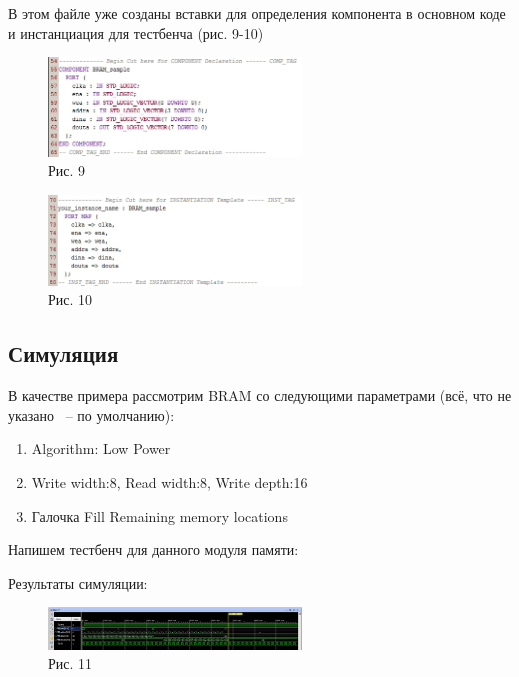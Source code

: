 В этом файле уже созданы вставки для определения компонента в основном коде и инстанциация для тестбенча (рис. 9-10)

\begin{figure}[h]
\centering
\includegraphics[width=0.6\textwidth]{9}
\caption{Рис. 9}
\label{9_label}
\end{figure}

\begin{figure}[h]
\centering
\includegraphics[width=0.6\textwidth]{10}
\caption{Рис. 10}
\label{10_label}
\end{figure}

\subsection{Симуляция}

В качестве примера рассмотрим BRAM со следующими параметрами (всё, что не указано ~-- по умолчанию):
\begin{enumerate}
\item Algorithm: Low Power
\item Write width:8, Read width:8, Write depth:16
\item Галочка Fill Remaining memory locations
\end{enumerate}

Напишем тестбенч для данного модуля памяти: 



Результаты симуляции:

\begin{figure}[h]
\centering
\includegraphics[width=0.6\textwidth]{11}
\caption{Рис. 11}
\label{11_label}
\end{figure}

